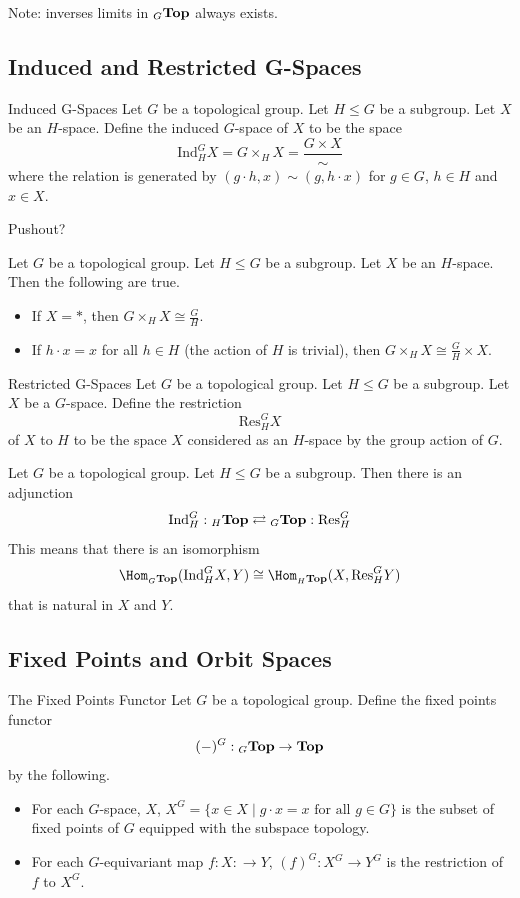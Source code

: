 \documentclass[a4paper]{article}
\begin{document}
Note: inverses limits in ${_G}\bold{Top}$ always exists. 

\subsection{Induced and Restricted G-Spaces}
\begin{defn}{Induced G-Spaces}{} Let $G$ be a topological group. Let $H\leq G$ be a subgroup. Let $X$ be an $H$-space. Define the induced $G$-space of $X$ to be the space $$\text{Ind}_H^GX=G\times_HX=\frac{G\times X}{\sim}$$ where the relation is generated by $(g\cdot h,x)\sim(g,h\cdot x)$ for $g\in G$, $h\in H$ and $x\in X$. 
\end{defn}

Pushout?

\begin{lmm}{}{} Let $G$ be a topological group. Let $H\leq G$ be a subgroup. Let $X$ be an $H$-space. Then the following are true. 
\begin{itemize}
\item If $X=\ast$, then $G\times_H X\cong\frac{G}{H}$. 
\item If $h\cdot x=x$ for all $h\in H$ (the action of $H$ is trivial), then $G\times_HX\cong\frac{G}{H}\times X$. 
\end{itemize}
\end{lmm}

\begin{defn}{Restricted G-Spaces}{} Let $G$ be a topological group. Let $H\leq G$ be a subgroup. Let $X$ be a $G$-space. Define the restriction $$\text{Res}_H^GX$$ of $X$ to $H$ to be the space $X$ considered as an $H$-space by the group action of $G$. 
\end{defn}

\begin{prp}{}{} Let $G$ be a topological group. Let $H\leq G$ be a subgroup. Then there is an adjunction $$\text{Ind}_H^G:{_H\bold{Top}}\rightleftarrows{_G\bold{Top}}:\text{Res}_H^G$$ This means that there is an isomorphism $$\Hom_{_G\bold{Top}}(\text{Ind}_H^GX,Y)\cong\Hom_{_H\bold{Top}}(X,\text{Res}_H^GY)$$ that is natural in $X$ and $Y$. 
\end{prp}

\subsection{Fixed Points and Orbit Spaces}
\begin{defn}{The Fixed Points Functor}{} Let $G$ be a topological group. Define the fixed points functor $$(-)^G:{_G\bold{Top}}\to\bold{Top}$$ by the following. 
\begin{itemize}
\item For each $G$-space, $X$, $X^G=\{x\in X\;|\;g\cdot x=x\text{ for all }g\in G\}$ is the subset of fixed points of $G$ equipped with the subspace topology. 
\item For each $G$-equivariant map $f:X:\to Y$, $(f)^G:X^G\to Y^G$ is the restriction of $f$ to $X^G$. 
\end{itemize}
\end{defn}
\end{document}
